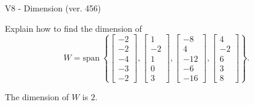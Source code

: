 \begin{exercise}
  \begin{exerciseTitle}V8 - Dimension (ver. 456)\end{exerciseTitle}
  \begin{exerciseStatement}
    Explain how to find the dimension of 
\[W=\mathrm{span}\ \left\{\left[\begin{array}{r}
-2 \\
-2 \\
-4 \\
-3 \\
-2
\end{array}\right] , \left[\begin{array}{r}
1 \\
-2 \\
1 \\
0 \\
3
\end{array}\right] , \left[\begin{array}{r}
-8 \\
4 \\
-12 \\
-6 \\
-16
\end{array}\right] , \left[\begin{array}{r}
4 \\
-2 \\
6 \\
3 \\
8
\end{array}\right]\right\}.\]



  \end{exerciseStatement}
  \begin{exerciseAnswer}
   The dimension of \(W\) is  \(2\).
  


  \end{exerciseAnswer}
\end{exercise}